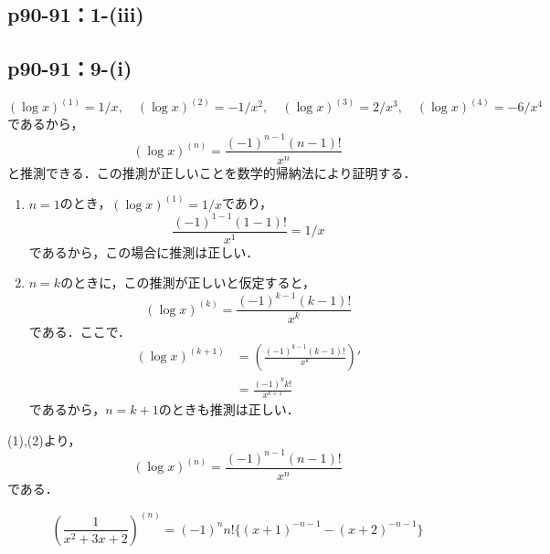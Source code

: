 \documentclass[uplatex,dvipdfmx,a4paper,10pt,fleqn]{jsarticle}
\begin{document}
    \subsection*{p90-91：1-(iii)}





\subsection*{p90-91：9-(i)}

\begin{tleftbar}
    \[
       ( \log x )^{(1)}= 1/x , \quad (\log x)^{(2)} = - 1/x^2 , \quad (\log x)^{(3)} = 2/x^3,\quad (\log x)^{(4)} = - 6 /x^4
    \]
    であるから，
    \[
        (\log x)^{(n)} = \frac{(-1)^{n-1}  (n-1)!}{x^n}
    \]
    と推測できる．この推測が正しいことを数学的帰納法により証明する．
    \begin{enumerate}
        \item $n=1$のとき，$(\log x)^{(1)} = 1/x$であり，
        \[
            \frac{(-1)^{1-1}  (1-1)!}{x^1}=1/x
        \]
        であるから，この場合に推測は正しい．
        \item $n=k$のときに，この推測が正しいと仮定すると，
        \[
            (\log x)^{(k)} = \frac{(-1)^{k-1}  (k-1)!}{x^k}
        \]
        である．ここで．
        \begin{align*} 
            (\log x)^{(k+1)} &= \left (\frac{(-1)^{k-1}  (k-1)!}{x^k} \right ) ' \\
            & = \frac{(-1)^k  k!}{x^{k+1}}
        \end{align*} 
        であるから，$n=k+1$のときも推測は正しい．
    \end{enumerate}
    (1),(2)より，
    \[
        (\log x)^{(n)} = \frac{(-1)^{n-1}  (n-1)!}{x^n}
     \]
     である．
\end{tleftbar}

\begin{tleftbar}
    \[
      \left(   \frac{1}{x^2+3x+2} \right)^{(n)} = (-1)^n n! \{ (x+1)^{-n-1} - (x+2)^{-n-1} \} 
    \]
\end{tleftbar}
\end{document}
